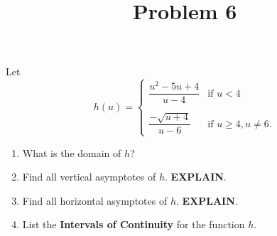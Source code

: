 \documentclass{ximera}
\title[Problem 6]{Problem 6}
\begin{document}
\begin{abstract} \end{abstract}
\maketitle

\begin{problem}
Let 
    \[
      h(u) =
      \begin{cases}
        \dfrac{u^2-5u+4}{u - 4} & \mbox{if $u < 4$}\\ \\
         \dfrac{-\sqrt{u+4}}{u - 6} & \mbox{if $u \ge 4, u \ne 6$}.
      \end{cases}
    \]

\begin{enumerate}
	\item What is the domain of $h$?
	\item Find all vertical asymptotes of $h$. \textbf{EXPLAIN}. 
\item Find all horizontal asymptotes of $h$. \textbf{EXPLAIN}.
	\item List the \textbf{Intervals of Continuity} for the function $h$.
\end{enumerate}
\end{problem}
\end{document}
